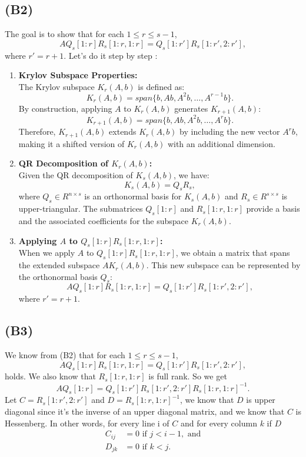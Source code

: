 \documentclass{article}
\begin{document}
\subsection*{(B2)}
The goal is to show that for each $ 1 \leq r \leq s - 1 $,
\[
A Q_s[1:r] R_s[1:r, 1:r] = Q_s[1:r'] R_s[1:r', 2:r'],
\]
where $ r' = r + 1 $.
Let's do it step by step : 
\begin{enumerate}
    \item \textbf{Krylov Subspace Properties:} \\
    The Krylov subspace $ K_r(A, b) $ is defined as:
    \[
    K_r(A, b) = span\{b, Ab, A^2b, \dots, A^{r-1}b\}.
    \]
    By construction, applying $ A $ to $ K_r(A, b) $ generates $ K_{r+1}(A, b) $:
    \[
    K_{r+1}(A, b) = span\{b, Ab, A^2b, \dots, A^r b\}.
    \]
    Therefore, $ K_{r+1}(A, b) $ extends $ K_r(A, b) $ by including the new vector $ A^r b $, making it a shifted version of $ K_r(A, b) $ with an additional dimension.

    \item \textbf{QR Decomposition of $ K_r(A, b) $:} \\
    Given the QR decomposition of $ K_s(A, b) $, we have:
    \[
    K_s(A, b) = Q_s R_s,
    \]
    where $ Q_s \in R^{n \times s} $ is an orthonormal basis for $ K_s(A, b) $ and $ R_s \in R^{s \times s} $ is upper-triangular. The submatrices $ Q_s[1:r] $ and $ R_s[1:r, 1:r] $ provide a basis and the associated coefficients for the subspace $ K_r(A, b) $.

    \item \textbf{Applying $ A $ to $ Q_s[1:r] R_s[1:r, 1:r] $:} \\
    When we apply $ A $ to $ Q_s[1:r] R_s[1:r, 1:r] $, we obtain a matrix that spans the extended subspace $ AK_{r}(A, b) $. This new subspace can be represented by the orthonormal basis $Q_{s}$:
    \[
    A Q_s[1:r] R_s[1:r, 1:r] = Q_s[1:r'] R_s[1:r', 2:r'],
    \]
    where $ r' = r + 1 $. 
\end{enumerate}


\subsection*{(B3)}
We know from (B2) that for each $1 \leq r \leq s-1$, 
\[
A Q_s[1:r] R_s[1:r, 1:r] = Q_s[1:r'] R_s[1:r', 2:r'],
\]
holds. We also know that $R_s[1:r, 1:r]$ is full rank. So we get 
\[
A Q_s[1:r]  = Q_s[1:r'] R_s[1:r', 2:r']R_s[1:r, 1:r]^{-1}.
\]
Let $C=R_s[1:r', 2:r']$ and $D=R_s[1:r, 1:r]^{-1}$, we know that $D$ is upper diagonal since it's the inverse of an upper diagonal matrix, and we know that $C$ is Hessenberg. In other words, for every line i of $C$ and for every column $k$ if $D$
\begin{align*}
    C_{ij} &= 0 \text{ if } j < i-1, \text{ and} \\
    D_{jk} &= 0 \text{ if } k < j.
\end{align*}
\end{document}
